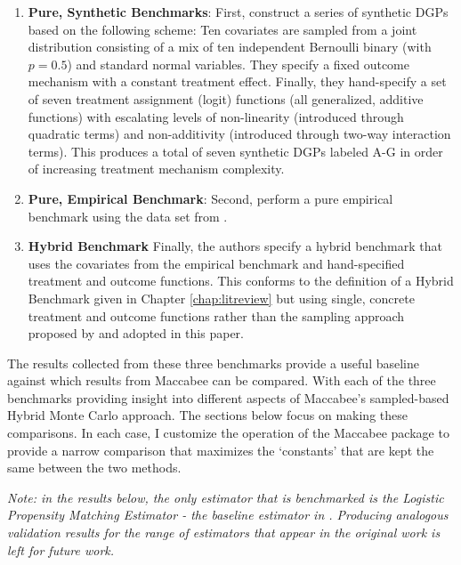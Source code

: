 \documentclass[../main.tex]{subfiles}
\begin{document}
\begin{enumerate}
    \item \textbf{Pure, Synthetic Benchmarks}: First, \citeauthor{Diamond2013GeneticStudies} construct a series of synthetic DGPs based on the following scheme: Ten covariates are sampled from a joint distribution consisting of a mix of ten independent Bernoulli binary (with $p=0.5$) and standard normal variables. They specify a fixed outcome mechanism with a constant treatment effect. Finally, they hand-specify a set of seven treatment assignment (logit) functions (all generalized, additive functions) with escalating levels of non-linearity (introduced through quadratic terms) and non-additivity (introduced through two-way interaction terms). This produces a total of seven synthetic DGPs labeled A-G in order of increasing treatment mechanism complexity.
    
    \item \textbf{Pure, Empirical Benchmark}: Second, \citeauthor{Diamond2013GeneticStudies} perform a pure empirical benchmark using the data set from \textcite{Lalonde1986EvaluatingData}.
    
    \item \textbf{Hybrid Benchmark} Finally, the authors specify a hybrid benchmark that uses the covariates from the \textcite{Lalonde1986EvaluatingData} empirical benchmark and hand-specified treatment and outcome functions. This conforms to the definition of a Hybrid Benchmark given in Chapter \ref{chap:litreview} but using single, concrete treatment and outcome functions rather than the sampling approach proposed by \textcite{Dorie2019Automated1} and adopted in this paper.
\end{enumerate}

The results collected from these three benchmarks provide a useful baseline against which results from Maccabee can be compared. With each of the three benchmarks providing insight into different aspects of Maccabee's sampled-based Hybrid Monte Carlo approach. The sections below focus on making these comparisons. In each case, I customize the operation of the Maccabee package to provide a narrow comparison that maximizes the `constants' that are kept the same between the two methods.

\vspace{\baselineskip}

\textit{Note: in the results below, the only estimator that is benchmarked is the Logistic Propensity Matching Estimator - the baseline estimator in \textcite{Diamond2013GeneticStudies}. Producing analogous validation results for the range of estimators that appear in the original work is left for future work.}
\end{document}
